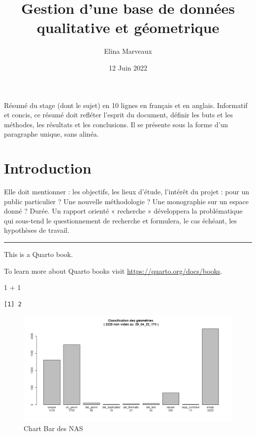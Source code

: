 \documentclass[
  12pt,
  a4paperpaper,
]{book}
\title{Gestion d'une base de données qualitative et géometrique}
\author{Elina Marveaux}
\date{12 Juin 2022}
\newenvironment{Shaded}{\begin{snugshade}}{\end{snugshade}}
\newcommand{\DecValTok}[1]{\textcolor[rgb]{0.16,0.63,0.60}{#1}}
\newcommand{\SpecialCharTok}[1]{\textcolor[rgb]{0.86,0.20,0.18}{#1}}
\renewcommand*\contentsname{Table of contents}
\newcommand\contentsname{Table of contents}
\begin{document}
\frontmatter
\maketitle
Résumé du stage (dont le sujet) en 10 lignes en français et en anglais. Informatif et concis, ce résumé doit refléter l'esprit du document, définir les buts et les méthodes, les résultats et les conclusions. Il se présente sous la forme d'un paragraphe unique, sans alinéa.

\renewcommand*\contentsname{Table des matières}
{
\setcounter{tocdepth}{2}
\tableofcontents
}
\mainmatter
{}

\hypertarget{introduction}{%
\chapter*{Introduction}\label{introduction}}

Elle doit mentionner : les objectifs, les lieux d'étude, l'intérêt du
projet : pour un public particulier ? Une nouvelle méthodologie ? Une
monographie sur un espace donné ? Durée. Un rapport orienté « recherche
» développera la problématique qui sous-tend le questionnement de
recherche et formulera, le cas échéant, les hypothèses de travail.

\begin{center}\rule{0.5\linewidth}{0.5pt}\end{center}

This is a Quarto book.

To learn more about Quarto books visit
\url{https://quarto.org/docs/books}.

\begin{Shaded}
\begin{Highlighting}[numbers=left,,]
\DecValTok{1} \SpecialCharTok{+} \DecValTok{1}
\end{Highlighting}
\end{Shaded}

\begin{verbatim}
[1] 2
\end{verbatim}

\begin{figure}

{\centering \includegraphics{./figures/bar_classify_Del_29_04_22_17h.png}

}

\caption{Chart Bar des NAS}

\end{figure}
\end{document}
